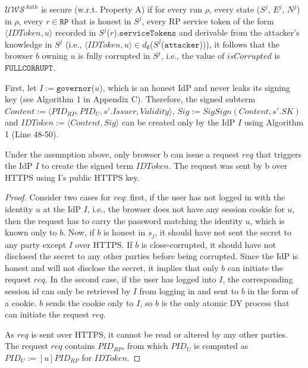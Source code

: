 
\begin{definition}
$\mathcal{UWS}^{Auth}$ is secure (w.r.t. Property A) if for every run $\rho$, every state ($S^j$, $E^j$, $N^j$) in $\rho$, every $r \in \mathtt{RP}$ that is honest in $S^j$, every RP service token of the form $\langle IDToken, u \rangle$ recorded in $S^j$($r$).$\mathtt{serviceTokens}$ and derivable from the attacker's knowledge in $S^j$ (i.e., $\langle IDToken, u \rangle \in d_{\emptyset}$($S^j$($\mathtt{attacker}$))), it follows that the browser $b$ owning $u$ is fully corrupted in $S^j$, i.e., the value of $isCorrupted$ is $\mathtt{FULLCORRUPT}$. %
\end{definition}

First, let $I:=\mathtt{governor}$($u$), which is an honest IdP and never leaks its signing key (see Algorithm 1 in Appendix C). Therefore, the signed subterm $Content:= \langle PID_{RP}, PID_U, s'.Issuer, Validity \rangle$, $Sig:= SigSign(Content, s'.SK)$ and $IDToken:= \langle Content, Sig \rangle$ can be created only by the IdP $I$ using Algorithm 1 (Line 48-50).%

\begin{lemma}
\label{lemma-user-request}
Under the assumption above, only browser b can issue a request $req$ that triggers the IdP $I$ to create the signed term $IDToken$. The request was sent by b over HTTPS using I's public HTTPS key.
\end{lemma}

\begin{proof}
Consider two cases for $req$: first, if the user has not logged in with the identity $u$ at the IdP $I$, i.e., the browser does not have any session cookie for $u$, then the request has to carry the password matching the identity $u$, which is known only to $b$. Now, if $b$ is honest in $s_j$, it should have not sent the secret to any party except $I$ over HTTPS. If $b$ is close-corrupted, it should have not disclosed the secret to any other parties before being corrupted. Since the IdP is honest and will not disclose the secret, it implies that only $b$ can initiate the request $req$. In the second case, if the user has logged into $I$, the corresponding session id can only be retrieved by $I$ from logging in and sent to $b$ in the form of a cookie. $b$ sends the cookie only to $I$, so $b$ is the only atomic DY process that can initiate the request $req$. 

As $req$ is sent over HTTPS, it cannot be read or altered by any other parties. The request $req$ contains $PID_{RP}$, from which $PID_U$ is computed as $PID_U:=[u]PID_{RP}$ for $IDToken$.
\end{proof}

